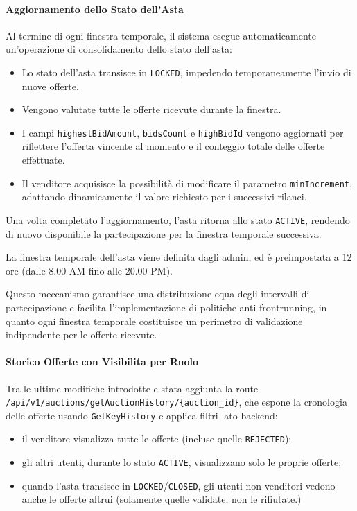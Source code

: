 \paragraph{Aggiornamento dello Stato dell'Asta}
Al termine di ogni finestra temporale, il sistema esegue automaticamente un'operazione di consolidamento dello stato dell'asta:
\begin{itemize}
    \item Lo stato dell'asta transisce in \texttt{LOCKED}, impedendo temporaneamente l'invio di nuove offerte.
    \item Vengono valutate tutte le offerte ricevute durante la finestra.
    \item I campi \texttt{highestBidAmount}, \texttt{bidsCount} e \texttt{highBidId} vengono aggiornati per riflettere l'offerta vincente al momento e il conteggio totale delle offerte effettuate.
    \item Il venditore acquisisce la possibilità di modificare il parametro \texttt{minIncrement}, adattando dinamicamente il valore richiesto per i successivi rilanci.
\end{itemize}
Una volta completato l'aggiornamento, l'asta ritorna allo stato \texttt{ACTIVE}, rendendo di nuovo disponibile la partecipazione per la finestra temporale successiva.

La finestra temporale dell'asta viene definita dagli admin, ed è preimpostata a 12 ore (dalle 8.00 AM fino alle 20.00 PM).

Questo meccanismo garantisce una distribuzione equa degli intervalli di partecipazione e facilita l'implementazione di politiche anti-frontrunning, in quanto ogni finestra temporale costituisce un perimetro di validazione indipendente per le offerte ricevute.

\paragraph{Storico Offerte con Visibilita per Ruolo}
Tra le ultime modifiche introdotte e stata aggiunta la route \texttt{/api/v1/auctions/getAuctionHistory/\{auction\_id\}}, che espone la cronologia delle offerte usando \texttt{GetKeyHistory} e applica filtri lato backend:
\begin{itemize}
    \item il venditore visualizza tutte le offerte (incluse quelle \texttt{REJECTED});
    \item gli altri utenti, durante lo stato \texttt{ACTIVE}, visualizzano solo le proprie offerte;
    \item quando l'asta transisce in \texttt{LOCKED}/\texttt{CLOSED}, gli utenti non venditori vedono anche le offerte altrui (solamente quelle validate, non le rifiutate.)
\end{itemize}

